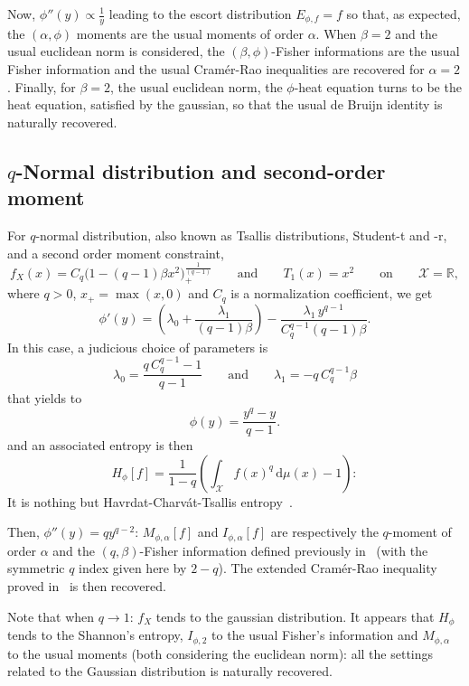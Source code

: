 \documentclass[entropy,article,submit,moreauthors,pdftex]{Definitions/mdpi}
\def\dmu{\mathrm{d}\mu}
\def\Rset{\mathbb{R}}
\def\X{\mathcal{X}}
\begin{document}
Now, $\phi''(y) \propto \frac1y$ leading  to the escort distribution $E_{\phi,f}
= f$ so that, as expected, the  $(\alpha,\phi)$ moments are the usual moments of
order $\alpha$. When $\beta = 2$ and the usual euclidean norm is considered, the
$(\beta,\phi)$-Fisher  informations are  the  usual Fisher  information and  the
usual Cram\'er-Rao  inequalities are recovered  for $\alpha = 2$.   Finally, for
$\beta = 2$, the usual euclidean norm,  the $\phi$-heat equation turns to be the
heat equation, satisfied  by the gaussian, so that the  usual de Bruijn identity
is naturally recovered.




\subsection{$q$-Normal distribution and second-order moment}
\label{subsec:qNormalSecondOrder}

For $q$-normal distribution, also known  as Tsallis distributions, Student-t and
-r, and a second order moment constraint,
%
\[
f_X(x)  = C_q  \Big( 1  - (q-1)  \beta x^2  \Big)_{\!+}^{\frac{1}{(q-1)}} \qquad
\mbox{and} \qquad T_1(x) = x^2 \qquad \mbox{on} \qquad \X = \Rset,
\]
%
where $q >  0$, $x_+ = \max(x,0)$  and $C_q$ is a  normalization coefficient, we
get
%
\[
\phi'(y)  =   \left(  \lambda_0   +  \frac{\lambda_1}{(q-1)  \beta}   \right)  -
\frac{\lambda_1 \, y^{q-1}}{C_q^{q-1} (q-1) \beta}.
\]
%
In this case, a judicious choice of parameters is
%
\[
\lambda_0 = \frac{q \, C_q^{q-1} -  1}{q-1} \qquad \mbox{and} \qquad \lambda_1 =
-q \, C_q^{q-1} \beta
\]
%
that yields to 
%
\[
\phi(y) = \frac{y^q-y}{q-1}.
\]
%
and an associated entropy is then 
%
\[
H_\phi[f] = \frac{1}{1-q} \left( \int_\X f(x)^q \, \dmu(x) - 1 \right):
\]
%
It  is  nothing  but  Havrdat-Charv\'at-Tsallis  entropy~\cite{HavCha67,  Dar70,
  Tsa88, CosHer03}.

Then, $\phi''(y) = q y^{q-2}$: $M_{\phi,\alpha}[f]$ and $I_{\phi,\alpha}[f]$ are
respectively  the  $q$-moment  of  order  $\alpha$  and  the  $(q,\beta)$-Fisher
information defined previously in~\cite{LutYan05, LutYan07, LutLv12, Ber12:06_1,
  Ber12:06_2, Ber13}  (with the symmetric  $q$ index  given here by  $2-q$). The
extended Cram\'er-Rao inequality proved in~\cite{LutYan05, Ber12:06_2, Ber13} is
then recovered.

Note that when $q  \to 1$: $f_X$ tends to the  gaussian distribution. It appears
that $H_\phi$ tends to the Shannon's entropy, $I_{\phi,2}$ to the usual Fisher's
information and  $M_{\phi,\alpha}$ to  the usual  moments (both  considering the
euclidean  norm): all  the  settings  related to  the  Gaussian distribution  is
naturally recovered.
\end{document}
